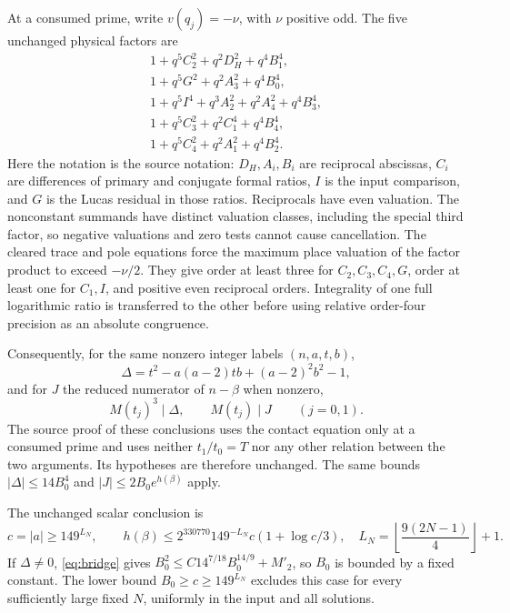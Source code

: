 \documentclass[11pt,a4paper]{article}
\begin{document}
At a consumed prime, write $v(q_j)=-\nu$, with $\nu$ positive odd.
The five unchanged physical factors are
\begin{align*}
1+q^5C_2^2+q^2D_H^2+q^4B_1^4,\\
1+q^5G^2+q^2A_3^2+q^4B_0^4,\\
1+q^5I^4+q^3A_2^2+q^2A_4^2+q^4B_3^4,\\
1+q^5C_3^2+q^2C_1^4+q^4B_4^4,\\
1+q^5C_4^2+q^2A_1^2+q^4B_2^4.
\end{align*}
Here the notation is the source notation: $D_H,A_i,B_i$ are
reciprocal abscissas, $C_i$ are differences of primary and conjugate
formal ratios, $I$ is the input comparison, and $G$ is the Lucas
residual in those ratios. Reciprocals have even valuation. The
nonconstant summands have distinct valuation classes, including the
special third factor, so negative valuations and zero tests cannot
cause cancellation. The cleared trace and pole equations force the
maximum place valuation of the factor product to exceed $-\nu/2$.
They give order at least three for $C_2,C_3,C_4,G$, order at least
one for $C_1,I$, and positive even reciprocal orders. Integrality of
one full logarithmic ratio is transferred to the other before using
relative order-four precision as an absolute congruence.

Consequently, for the same nonzero integer labels $(n,a,t,b)$,
\[
 \Delta=t^2-a(a-2)tb+(a-2)^2b^2-1,
\]
and for $J$ the reduced numerator of $n-\beta$ when nonzero,
\begin{equation}\label{eq:divs}
 M(t_j)^3\mid\Delta,\qquad M(t_j)\mid J\qquad(j=0,1).
\end{equation}
The source proof of these conclusions uses the contact equation only
at a consumed prime and uses neither $t_1/t_0=T$ nor any other
relation between the two arguments. Its hypotheses are therefore
unchanged. The same bounds $|\Delta|\le14B_0^4$ and
$|J|\le2B_0 e^{h(\beta)}$ apply.

The unchanged scalar conclusion is
\begin{equation}\label{eq:scalar}
 c=|a|\ge149^{L_N},\qquad
 h(\beta)\le2^{330770}149^{-L_N}c(1+\log c/3),
 \quad L_N=\left\lfloor\frac{9(2N-1)}4\right\rfloor+1.
\end{equation}
If $\Delta\ne0$, \eqref{eq:bridge} gives
$B_0^2\le C14^{7/18}B_0^{14/9}+M'_2$, so $B_0$ is bounded by a
fixed constant. The lower bound $B_0\ge c\ge149^{L_N}$ excludes
this case for every sufficiently large fixed $N$, uniformly in the
input and all solutions.
\end{document}
